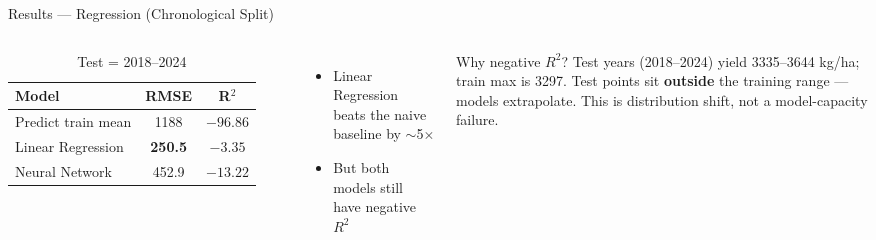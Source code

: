 \documentclass[aspectratio=169]{beamer}
\begin{document}
\begin{frame}{Results --- Regression (Chronological Split)}
  \begin{columns}
      \begin{table}
        \centering
        \caption{Test = 2018--2024}
        \begin{tabular}{lcc}
          \toprule
          \textbf{Model} & \textbf{RMSE} & \textbf{R$^2$} \\
          \midrule
          Predict train mean & 1188 & $-96.86$ \\
          Linear Regression  & \textbf{250.5} & $-3.35$ \\
          Neural Network     & 452.9 & $-13.22$ \\
          \bottomrule
        \end{tabular}
      \end{table}
      \vspace{0.5em}
      \begin{itemize}
        \item Linear Regression beats the naive baseline by $\sim$5$\times$
        \item But both models still have negative $R^2$
      \end{itemize}
      \begin{block}{Why negative $R^2$?}
        Test years (2018--2024) yield 3335--3644 kg/ha; train max is 3297. Test points sit \textbf{outside} the training range — models extrapolate. This is distribution shift, not a model-capacity failure.
      \end{block}
  \end{columns}
\end{frame}
\end{document}
